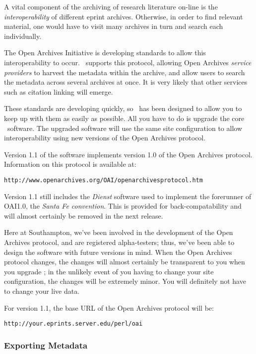 A vital component of the archiving of research literature on-line is the \emph{interoperability} of different eprint archives. Otherwise, in order to find relevant material, one would have to visit many archives in turn and search each individually.

The Open Archives Initiative is developing standards to allow this interoperability to occur. \eprints\ supports this protocol, allowing Open Archives \emph{service providers} to harvest the metadata within the archive, and allow users to search the metadata across several archives at once. It is very likely that other services such as citation linking will emerge.

These standards are developing quickly, so \eprints\ has been designed to allow you to keep up with them as easily as possible. All you have to do is upgrade the core \eprints\ software. The upgraded software will use the same site configuration to allow interoperability using new versions of the Open Archives protocol.

Version 1.1 of the software implements version 1.0 of the Open Archives protocol. Information on this protocol is available at:

\begin{verbatim}
http://www.openarchives.org/OAI/openarchivesprotocol.htm
\end{verbatim}

Version 1.1 still includes the \emph{Dienst} software used to implement the forerunner of OAI1.0, the \emph{Santa Fe convention}.  This is provided for back-compatability and will almost certainly be removed in the next release.

Here at Southampton, we've been involved in the development of the Open Archives protocol, and are registered alpha-testers; thus, we've been able to design the software with future versions in mind. When the Open Archives protocol changes, the changes will almost certainly be transparent to you when you upgrade \eprints; in the unlikely event of you having to change your site configuration, the changes will be extremely minor. You will definitely not have to change your live data.

For version 1.1, the base URL of the Open Archives protocol will be:

\begin{verbatim}
http://your.eprints.server.edu/perl/oai
\end{verbatim}


\subsubsection{Exporting Metadata}

